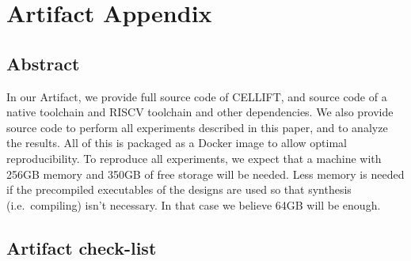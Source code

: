 \documentclass[letterpaper,twocolumn,10pt]{article}
\begin{document}


\newcommand{\ourname}{C{\smaller[1]ELL}IFT\xspace}

\appendix
\section{Artifact Appendix}

%

\subsection{Abstract}

In our Artifact, we provide full source code of \ourname, and source code
of a native toolchain and RISCV toolchain and other dependencies. We also
provide source code to perform all experiments described in this paper,
and to analyze the results. All of this is packaged as a Docker image to
allow optimal reproducibility. To reproduce all experiments, we expect that
a machine with 256GB memory and 350GB of free storage will be needed. Less memory is needed if the
precompiled executables of the designs are used so that synthesis (i.e.\ compiling)
isn't necessary. In that case we believe 64GB will be enough.

\subsection{Artifact check-list}

\end{document}

